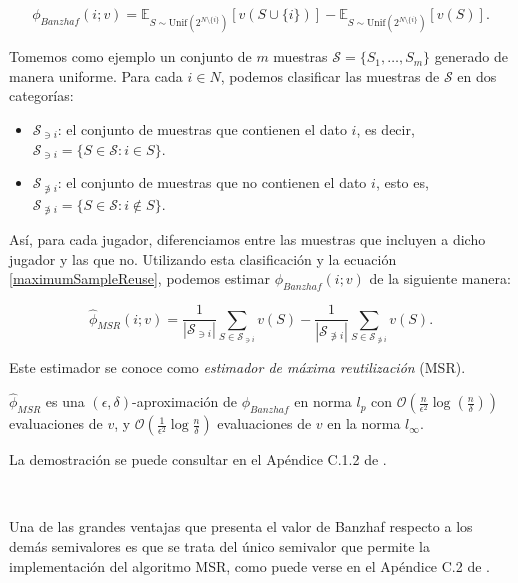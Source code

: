 \begin{equation}
  \label{maximumSampleReuse}
  \phi_{Banzhaf}(i;v) = \mathbb{E}_{S \sim \text{Unif}(2^{N\setminus \{i\}})}
  [v(S \cup \{i\})] - 
  \mathbb{E}_{S \sim \text{Unif}(2^{N\setminus \{i\}})}
  [v(S)].
\end{equation}

Tomemos como ejemplo un conjunto de $m$ muestras
$\mathcal{S} = \{S_1,\dots,S_m\}$ generado de manera
uniforme. Para cada $i \in N$, podemos clasificar las
muestras de $\mathcal{S}$ en dos categorías:

\begin{itemize}
  \item $\mathcal{S}_{\ni i}$: el conjunto de muestras
  que contienen el dato $i$, es decir,
  $\mathcal{S}_{\ni i} = \{S \in \mathcal{S}: i \in S\}$.
  \item $\mathcal{S}_{\not \ni  i}$: el conjunto de muestras
  que no contienen el dato $i$, esto es,
  $\mathcal{S}_{\not \ni  i} = \{S \in \mathcal{S}: i \not
  \in S\}$.
\end{itemize}

Así, para cada jugador, diferenciamos entre las muestras
que incluyen a dicho jugador y las que no. Utilizando esta
clasificación y la ecuación \ref{maximumSampleReuse},
podemos estimar $\phi_{Banzhaf}(i;v)$ de la siguiente manera: 

\begin{equation*}
  \hat{\phi}_{MSR}(i;v) = \frac{1}{|\mathcal{S}_{\ni i}|}
  \sum_{S \in \mathcal{S}_{\ni i}} v(S) -
  \frac{1}{|\mathcal{S}_{\not \ni i}|}
  \sum_{S \in \mathcal{S}_{\not \ni i}} v(S).
\end{equation*}

Este estimador se conoce como \emph{estimador de máxima
reutilización} (MSR). 

\begin{theorem}
  $\hat{\phi}_{MSR}$ es una $(\epsilon,\delta)$-aproximación
  de $\phi_{Banzhaf}$ en norma $l_p$ con  $\mathcal{O}
  (\frac{n}{\epsilon^2} \log(\frac{n}{\delta}))$ evaluaciones
  de $v$, y $\mathcal{O}(\frac{1}{\epsilon^2}
  \log{\frac{n}{\delta}})$ evaluaciones de $v$ en la norma
  $l_{\infty}$.
\end{theorem}


La demostración se puede consultar en el 
Apéndice C.1.2 de \cite{dataBanzhaf}.

\

Una de las grandes ventajas que presenta el valor
de Banzhaf respecto a los demás semivalores es que
se trata del único semivalor que permite la implementación
del algoritmo MSR, como puede verse en el Apéndice
C.2 de \cite{dataBanzhaf}.

